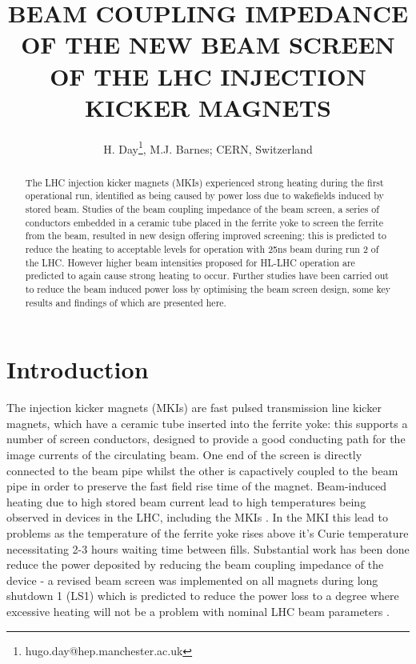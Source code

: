\documentclass[a4paper,
              ]{jacow}
\begin{document}
\title{BEAM COUPLING IMPEDANCE OF THE NEW BEAM SCREEN OF THE LHC INJECTION KICKER MAGNETS}
\author{H. Day\thanks{hugo.day@hep.manchester.ac.uk}, M.J. Barnes;  CERN, Switzerland}

\maketitle 


\begin{abstract}
The LHC injection kicker magnets (MKIs) experienced strong heating during the first operational run, identified as being caused by power loss due to wakefields induced by stored beam. Studies of the beam coupling impedance of the beam screen, a series of conductors embedded in a ceramic tube placed in the ferrite yoke to screen the ferrite from the beam, resulted in new design offering improved screening: this is predicted to reduce the heating to acceptable levels for operation with 25ns beam during run 2 of the LHC. However higher beam intensities proposed for HL-LHC operation are predicted to again cause strong heating to occur. Further studies have been carried out to reduce the beam induced power loss by optimising the beam screen design, some key results and findings of which are presented here.
\end{abstract}

\section{Introduction}

The injection kicker magnets (MKIs) are fast pulsed transmission line kicker magnets, which have a ceramic tube inserted into the ferrite yoke: this supports a number of screen conductors, designed to provide a good conducting path for the image currents of the circulating beam. One end of the screen is directly connected to the beam pipe whilst the other is capactively coupled to the beam pipe in order to preserve the fast field rise time of the magnet. Beam-induced heating due to high stored beam current lead to high temperatures being observed in devices in the LHC, including the MKIs \cite{mki-heatingTemp}. In the MKI this lead to problems as the temperature of the ferrite yoke rises above it's Curie temperature necessitating 2-3 hours waiting time between fills. Substantial work has been done reduce the power deposited by reducing the beam coupling impedance of the device - a revised beam screen was implemented on all magnets during long shutdown 1 (LS1) which is predicted to reduce the power loss to a degree where excessive heating will not be a problem with nominal LHC beam parameters \cite{mkiImp2014}. 
\end{document}
